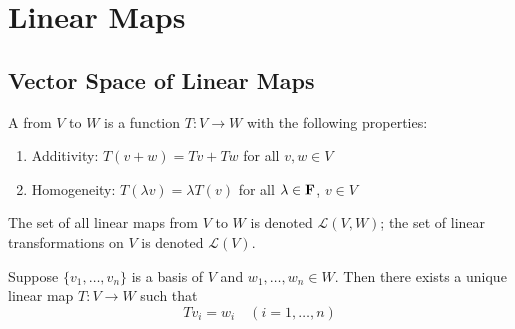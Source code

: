 \chapter{Linear Maps}\label{chap:linear-maps}
\section{Vector Space of Linear Maps}
\begin{definition}
A  from $V$ to $W$ is a function $T:V\to W$ with the following properties:
\begin{enumerate}[label=(\roman*)]
\item Additivity: $T(v+w)=Tv+Tw$ for all $v,w\in V$
\item Homogeneity: $T(\lambda v)=\lambda T(v)$ for all $\lambda\in\mathbf F$, $v\in V$
\end{enumerate}
\end{definition}

\begin{notation}
The set of all linear maps from $V$ to $W$ is denoted $\mathcal{L}(V,W)$; the set of linear transformations on $V$ is denoted $\mathcal{L}(V)$.
\end{notation}

\begin{proposition}
Suppose $\{v_1,\dots,v_n\}$ is a basis of $V$ and $w_1,\dots,w_n\in W$. Then there exists a unique linear map $T:V\to W$ such that
\[Tv_i=w_i\quad(i=1,\dots,n)\]
\end{proposition}


